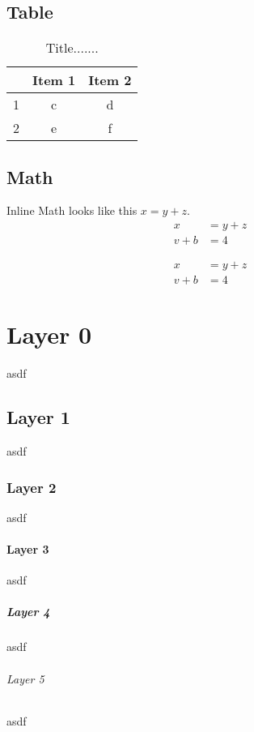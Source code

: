 \section{Table}
\begin{table}[H] %
	\begin{center}
		\begin{tabular}{c|cc}
			& Item 1 & Item 2 \\
			\hline
			1 & c & d \\
			2 & e & f
		\end{tabular}
		\caption{Title.......}
		\label{tab:8bitnumber}
	\end{center}
\end{table}

\section{Math}
Inline Math looks like this $x = y + z$.
\begin{align}
	x &= y + z \\
	v + b &= 4
\end{align}

\begin{align*}
x &= y + z \\
v + b &= 4
\end{align*}

\newpage
\chapter{Layer 0}
asdf
\section{Layer 1}
asdf
\subsection{Layer 2}
asdf
\subsubsection{Layer 3}
asdf
\paragraph{Layer 4}
asdf
\subparagraph{Layer 5}
asdf